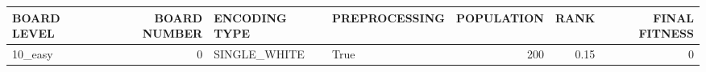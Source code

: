 \begin{tabular}{lrllrrr}
\hline
 BOARD LEVEL   &   BOARD NUMBER & ENCODING TYPE   & PREPROCESSING   &   POPULATION &   RANK &   FINAL FITNESS \\
\hline
 10\_easy       &              0 & SINGLE\_WHITE    & True            &          200 &   0.15 &               0 \\
\hline
\end{tabular}